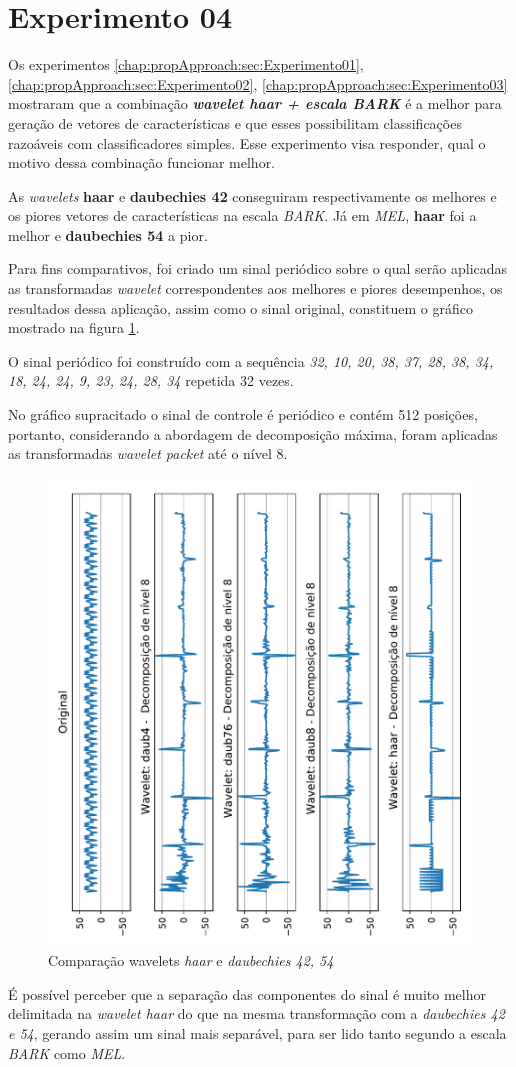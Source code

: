 	\newpage
	\section{Experimento 04}
		\par Os experimentos \ref{chap:propApproach:sec:Experimento01}, \ref{chap:propApproach:sec:Experimento02}, \ref{chap:propApproach:sec:Experimento03} mostraram que a combinação \textbf{\textit{wavelet haar + escala BARK}} é a melhor para geração de vetores de características e que esses possibilitam classificações razoáveis com classificadores simples. Esse experimento visa responder, qual o motivo dessa combinação funcionar melhor.
		\par As \textit{wavelets} \textbf{haar} e \textbf{daubechies 42} conseguiram respectivamente os melhores e os piores vetores de características na escala \textit{BARK}. Já em \textit{MEL}, \textbf{haar} foi a melhor e \textbf{daubechies 54} a pior.
		\par Para fins comparativos, foi criado um sinal periódico sobre o qual serão aplicadas as transformadas \textit{wavelet} correspondentes aos melhores e piores desempenhos, os resultados dessa aplicação, assim como o sinal original, constituem o gráfico mostrado na figura \ref{fig:haardaub42comparison}.
		\par O sinal periódico foi construído com a sequência \textit{32, 10, 20, 38, 37, 28, 38, 34, 18, 24, 24, 9, 23, 24, 28, 34} repetida 32 vezes.
		\par No gráfico supracitado o sinal de controle é periódico e contém 512 posições, portanto, considerando a abordagem de decomposição máxima, foram aplicadas as transformadas \textit{wavelet packet} até o nível 8.
		
		\begin{figure}[h]
			\centering
			\includegraphics[width=0.6\linewidth]{images/results/haarDaubComparison/haarDaub42Comparison.pdf}
			\caption{Comparação wavelets \textit{haar} e \textit{daubechies 42, 54}}
			\label{fig:haardaub42comparison}
		\end{figure}
		
		\par É possível perceber que a separação das componentes do sinal é muito melhor delimitada na \textit{wavelet haar} do que na mesma transformação com a \textit{daubechies 42 e 54}, gerando assim um sinal mais separável, para ser lido tanto segundo a escala \textit{BARK} como \textit{MEL}.
		

	
